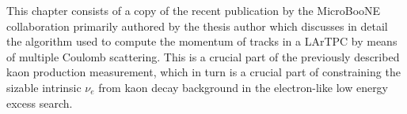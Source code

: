 This chapter consists of a copy of the recent publication by the MicroBooNE collaboration primarily authored by the thesis author which discusses in detail the algorithm used to compute the momentum of tracks in a LArTPC by means of multiple Coulomb scattering. This is a crucial part of the previously described kaon production measurement, which in turn is a crucial part of constraining the sizable intrinsic $\nu_e$ from kaon decay background in the electron-like low energy excess search.
